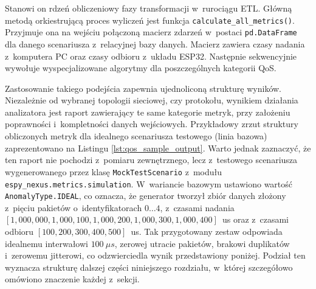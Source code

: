 Stanowi on rdzeń obliczeniowy fazy transformacji w~rurociągu ETL.
Główną metodą orkiestrującą proces wyliczeń jest funkcja \texttt{calculate\_all\_metrics()}.
Przyjmuje ona na wejściu połączoną macierz zdarzeń w~postaci \texttt{pd.DataFrame} dla danego scenariusza z~relacyjnej bazy danych.
Macierz zawiera czasy nadania z~komputera PC oraz czasy odbioru z~układu ESP32.
Następnie sekwencyjnie wywołuje wyspecjalizowane algorytmy dla poszczególnych kategorii QoS.

Zastosowanie takiego podejścia zapewnia ujednoliconą strukturę wyników.
Niezależnie od wybranej topologii sieciowej, czy protokołu, wynikiem działania analizatora jest raport zawierający te same kategorie metryk, przy założeniu poprawności i~kompletności danych wejściowych.
Przykładowy zrzut struktury obliczonych metryk dla idealnego scenariusza testowego (linia bazowa) zaprezentowano na Listingu \ref{lst:qos_sample_output}.
Warto jednak zaznaczyć, że ten raport nie pochodzi z~pomiaru zewnętrznego, lecz z~testowego scenariusza wygenerowanego przez klasę \texttt{MockTestScenario} z~modułu \texttt{espy\_nexus.metrics.simulation}.
W~wariancie bazowym ustawiono wartość \texttt{AnomalyType.IDEAL}, co oznacza, że generator tworzył zbiór danych złożony z~pięciu pakietów o~identyfikatorach $0\ldots4$, z~czasami nadania $[1{,}000{,}000, 1{,}000{,}100, 1{,}000{,}200, 1{,}000{,}300, 1{,}000{,}400]$~us oraz z~czasami odbioru $[100, 200, 300, 400, 500]$~us.
Tak przygotowany zestaw odpowiada idealnemu interwałowi $100~\mu s$, zerowej utracie pakietów, brakowi duplikatów i~zerowemu jitterowi, co odzwierciedla wynik przedstawiony poniżej.
Podział ten wyznacza strukturę dalszej części niniejszego rozdziału, w~której szczegółowo omówiono znaczenie każdej z~sekcji.

